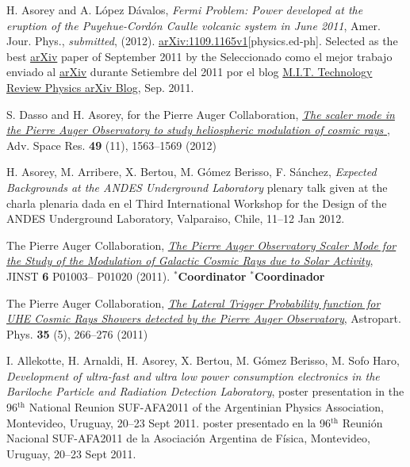 \noindent
\begin{etaremune}
\item {}H. Asorey and A. López Dávalos, {\emph{Fermi Problem: Power
developed at the eruption of the Puyehue-Cordón Caulle volcanic system in June
2011}}, Amer. Jour. Phys., {\emph{submitted}}, (2012).
\href{http://arxiv.org/abs/1109.1165}{arXiv:1109.1165v1}[physics.ed-ph]. 
\ifeng
Selected as the best \href{http://arxiv.org}{arXiv} paper of September 2011 by the
\else
Seleccionado como el mejor trabajo enviado al \href{http://arxiv.org}{arXiv} durante Setiembre del 2011 por el blog 
\fi
\href{http://www.technologyreview.com/blog/arxiv/27140/}{M.I.T. Technology
Review Physics arXiv Blog}, Sep. 2011.

\item {}S. Dasso and H. Asorey, for the Pierre Auger Collaboration,
\href{http://dx.doi.org/10.1016/j.asr.2011.12.028}{\emph{ The scaler mode in
the Pierre Auger Observatory to study heliospheric modulation of cosmic rays
}}, Adv. Space Res. {\bf{49}} (11), 1563--1569 (2012)

\item {} H. Asorey, M. Arribere, X. Bertou, M. Gómez Berisso, F. Sánchez,
{\emph{Expected Backgrounds at the ANDES Underground Laboratory}}
\ifeng
plenary talk given at the
\else 
charla plenaria dada en el
\fi
Third International Workshop for the Design of the ANDES Underground Laboratory, Valparaiso, Chile, 11--12 Jan 2012.

\item {}The Pierre Auger Collaboration,
\href{http://dx.doi.org/10.1088/1748-0221/6/01/P01003}{\emph{The Pierre Auger
Observatory Scaler Mode for the Study of the Modulation of Galactic Cosmic Rays
due to Solar Activity}}, JINST {\bf 6} P01003--
P01020 (2011).
\ifeng $^*${\bf{Coordinator}} \else $^*${\bf{Coordinador}} \fi

\item {} The Pierre Auger Collaboration, 
\href{http://dx.doi.org/10.1016/j.astropartphys.2011.08.001}{\emph{The Lateral
Trigger Probability function for UHE Cosmic Rays Showers detected by the Pierre
Auger Observatory}}, Astropart. Phys. {\bf{35}} (5), 266--276 (2011)

\item {}I. Allekotte, H. Arnaldi, H. Asorey, X. Bertou, M. Gómez Berisso,
M. Sofo Haro, {\emph{Development of ultra-fast and ultra low power consumption
electronics in the Bariloche Particle and Radiation Detection Laboratory}},
\ifeng
poster presentation in the 96$^{\mathrm{th}}$ National Reunion SUF-AFA2011 of the Argentinian Physics Association, Montevideo, Uruguay, 20--23 Sept 2011.
\else
poster presentado en la 96$^{\mathrm{th}}$ Reunión Nacional SUF-AFA2011 de la Asociación Argentina de Física, Montevideo, Uruguay, 20--23 Sept 2011.
\fi


\end{etaremune}
